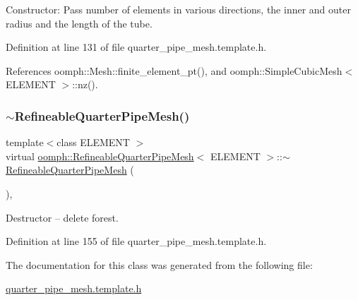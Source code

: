 Constructor\+: Pass number of elements in various directions, the inner and outer radius and the length of the tube. 



Definition at line 131 of file quarter\+\_\+pipe\+\_\+mesh.\+template.\+h.



References oomph\+::\+Mesh\+::finite\+\_\+element\+\_\+pt(), and oomph\+::\+Simple\+Cubic\+Mesh$<$ E\+L\+E\+M\+E\+N\+T $>$\+::nz().

\mbox{\label{classoomph_1_1RefineableQuarterPipeMesh_ad2015da2ae7382f3fe2c3a088f4fa021}} 
\subsubsection{\texorpdfstring{$\sim$\+Refineable\+Quarter\+Pipe\+Mesh()}{~RefineableQuarterPipeMesh()}}
{\footnotesize\ttfamily template$<$class E\+L\+E\+M\+E\+NT $>$ \\
virtual \hyperlink{classoomph_1_1RefineableQuarterPipeMesh}{oomph\+::\+Refineable\+Quarter\+Pipe\+Mesh}$<$ E\+L\+E\+M\+E\+NT $>$\+::$\sim$\hyperlink{classoomph_1_1RefineableQuarterPipeMesh}{Refineable\+Quarter\+Pipe\+Mesh} (\begin{DoxyParamCaption}{ }\end{DoxyParamCaption})\hspace{0.3cm}{\ttfamily [inline]}, {\ttfamily [virtual]}}



Destructor -- delete forest. 



Definition at line 155 of file quarter\+\_\+pipe\+\_\+mesh.\+template.\+h.



The documentation for this class was generated from the following file\+:\begin{DoxyCompactItemize}
\item 
\hyperlink{quarter__pipe__mesh_8template_8h}{quarter\+\_\+pipe\+\_\+mesh.\+template.\+h}\end{DoxyCompactItemize}
